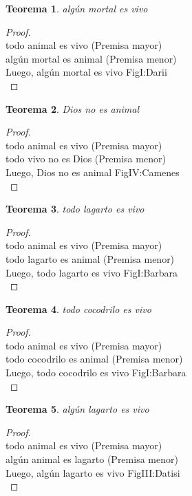 ﻿\documentclass[12pt]{book}
\newtheorem{theorem}{Teorema}[chapter]
\newtheorem{proof}{Demostración}
\begin{document}
\begin{theorem}
algún mortal es vivo
\label{th: 41}
\end{theorem}\begin{proof}\\todo animal es vivo	 (Premisa mayor) \\algún mortal es animal	 (Premisa menor) \\Luego, algún mortal es vivo	FigI:Darii \\ \end{proof}
\begin{theorem}
Dios no es animal
\label{th: 42}
\end{theorem}\begin{proof}\\todo animal es vivo	 (Premisa mayor) \\todo vivo no es Dios	 (Premisa menor) \\Luego, Dios no es animal	FigIV:Camenes \\ \end{proof}
\begin{theorem}
todo lagarto es vivo
\label{th: 43}
\end{theorem}\begin{proof}\\todo animal es vivo	 (Premisa mayor) \\todo lagarto es animal	 (Premisa menor) \\Luego, todo lagarto es vivo	FigI:Barbara \\ \end{proof}
\begin{theorem}
todo cocodrilo es vivo
\label{th: 44}
\end{theorem}\begin{proof}\\todo animal es vivo	 (Premisa mayor) \\todo cocodrilo es animal	 (Premisa menor) \\Luego, todo cocodrilo es vivo	FigI:Barbara \\ \end{proof}
\begin{theorem}
algún lagarto es vivo
\label{th: 45}
\end{theorem}\begin{proof}\\todo animal es vivo	 (Premisa mayor) \\algún animal es lagarto	 (Premisa menor) \\Luego, algún lagarto es vivo	FigIII:Datisi \\ \end{proof}
\end{document}
